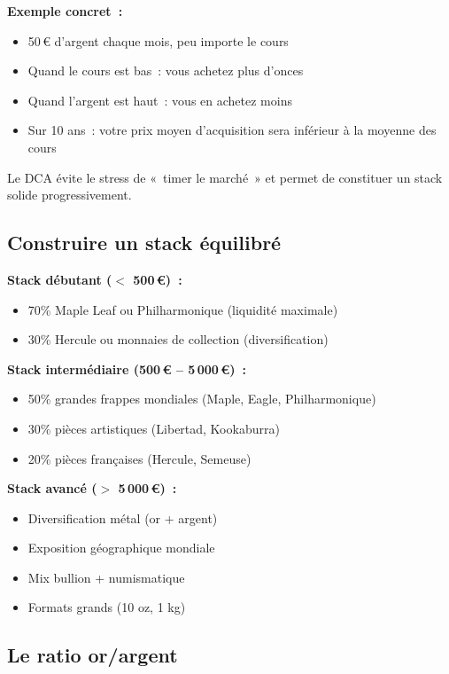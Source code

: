 \documentclass[14pt,a4paper]{extarticle}
\begin{document}
\textbf{Exemple concret~:}
\begin{itemize}
  \item 50\,€ d'argent chaque mois, peu importe le cours
  \item Quand le cours est bas~: vous achetez plus d'onces
  \item Quand l'argent est haut~: vous en achetez moins
  \item Sur 10 ans~: votre prix moyen d'acquisition sera inférieur à la moyenne des cours
\end{itemize}

Le DCA évite le stress de «~timer le marché~» et permet de constituer un stack solide progressivement.

\subsection{Construire un stack équilibré}

\textbf{Stack débutant ($<$ 500\,€)~:}
\begin{itemize}
  \item 70\% Maple Leaf ou Philharmonique (liquidité maximale)
  \item 30\% Hercule ou monnaies de collection (diversification)
\end{itemize}

\textbf{Stack intermédiaire (500\,€ -- 5\,000\,€)~:}
\begin{itemize}
  \item 50\% grandes frappes mondiales (Maple, Eagle, Philharmonique)
  \item 30\% pièces artistiques (Libertad, Kookaburra)
  \item 20\% pièces françaises (Hercule, Semeuse)
\end{itemize}

\textbf{Stack avancé ($>$ 5\,000\,€)~:}
\begin{itemize}
  \item Diversification métal (or + argent)
  \item Exposition géographique mondiale
  \item Mix bullion + numismatique
  \item Formats grands (10 oz, 1 kg)
\end{itemize}

\subsection{Le ratio or/argent}
\end{document}

